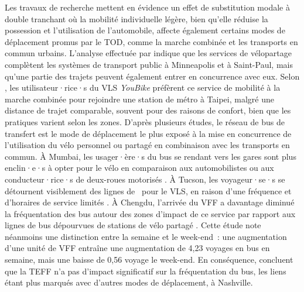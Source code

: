 \begin{refsegment}
Les travaux de recherche mettent en évidence un effet de substitution modale à double tranchant où la mobilité individuelle légère, bien qu’elle réduise la possession et l'utilisation de l'automobile, affecte également certains modes de déplacement promus par le \acrshort{TOD}, comme la marche combinée et les transports en commun urbains. L'analyse effectuée par \textcolor{blue}{\textcite[10]{song_investigating_2020}} indique que les services de vélopartage complètent les systèmes de transport public à Minneapolis et à Saint-Paul, mais qu'une partie des trajets peuvent également entrer en concurrence avec eux. Selon \textcolor{blue}{\textcite[8]{yen_how_2023}}, les utilisateur·rice·s du \acrshort{VLS} \textsl{YouBike} préfèrent ce service de mobilité à la marche combinée pour rejoindre une station de métro à Taipei, malgré une distance de trajet comparable, souvent pour des raisons de confort, bien que les pratiques varient selon les zones. D'après plusieurs études, le réseau de bus de transfert est le mode de déplacement le plus exposé à la mise en concurrence de l'utilisation du vélo personnel ou partagé en combinaison avec les transports en commun. À Mumbai, les usager·ère·s du bus se rendant vers les gares sont plus enclin·e·s à opter pour le vélo en comparaison aux automobilistes ou aux conducteur·rice·s de deux-roues motorisés \textcolor{blue}{\autocite[6]{rastogi_willingness_2010}}. À Tucson, les voyageur·se·s se détournent visiblement des lignes de ~pour le \acrshort{VLS}, en raison d'une fréquence et d'horaires de service limités \textcolor{blue}{\autocite[16]{li_investigating_2022}}. À Chengdu, l'arrivée du \acrshort{VFF} a davantage diminué la fréquentation des bus autour des zones d'impact de ce service par rapport aux lignes de bus dépourvues de stations de vélo partagé \textcolor{blue}{\autocite[107]{ma_impacts_2019}}. Cette étude note néanmoins une distinction entre la semaine et le week-end~: une augmentation d'une unité de \acrshort{VFF} entraîne une augmentation de 4,23 voyages en bus en semaine, mais une baisse de 0,56 voyage le week-end. En conséquence, \textcolor{blue}{\textcite[11]{ziedan_complement_2021}} concluent que la \acrshort{TEFF} n'a pas d'impact significatif sur la fréquentation du bus, les liens étant plus marqués avec d'autres modes de déplacement, à Nashville.%


\end{refsegment}
